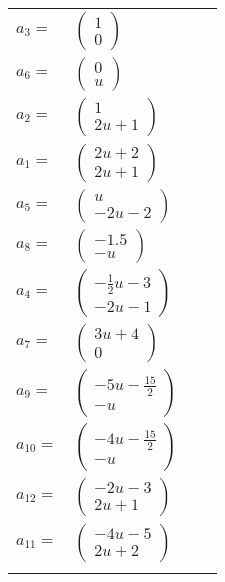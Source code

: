 \documentclass[1p]{elsarticle_modified}
\theoremstyle{definition}
\begin{document}
\begin{tabular}{m{7pt} m{180pt} m{7pt} m{180pt} }
\flushright $a_{3}=$&$\begin{pmatrix}1\\0\end{pmatrix}$ \\
\flushright $a_{6}=$&$\begin{pmatrix}0\\u\end{pmatrix}$ \\
\flushright $a_{2}=$&$\begin{pmatrix}1\\2 u+1\end{pmatrix}$ \\
\flushright $a_{1}=$&$\begin{pmatrix}2 u+2\\2 u+1\end{pmatrix}$ \\
\flushright $a_{5}=$&$\begin{pmatrix}u\\-2 u-2\end{pmatrix}$ \\
\flushright $a_{8}=$&$\begin{pmatrix}-1.5\\- u\end{pmatrix}$ \\
\flushright $a_{4}=$&$\begin{pmatrix}-\frac{1}{2} u-3\\-2 u-1\end{pmatrix}$ \\
\flushright $a_{7}=$&$\begin{pmatrix}3 u+4\\0\end{pmatrix}$ \\
\flushright $a_{9}=$&$\begin{pmatrix}-5 u-\frac{15}{2}\\- u\end{pmatrix}$ \\
\flushright $a_{10}=$&$\begin{pmatrix}-4 u-\frac{15}{2}\\- u\end{pmatrix}$ \\
\flushright $a_{12}=$&$\begin{pmatrix}-2 u-3\\2 u+1\end{pmatrix}$ \\
\flushright $a_{11}=$&$\begin{pmatrix}-4 u-5\\2 u+2\end{pmatrix}$\\&\end{tabular}
\end{document}
